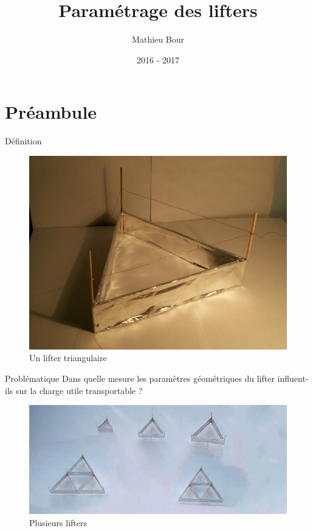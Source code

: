 \documentclass{beamer}
\title{Paramétrage des lifters}
\author{Mathieu Bour}
\date{2016 - 2017}
\begin{document}
	\begin{frame}
		\titlepage
	\end{frame}

	\section{Préambule}
		\begin{frame}{Définition}
			\begin{figure}
				\center
				\includegraphics[scale=0.3]{img/photo1.jpg}
				\caption{Un lifter triangulaire}
			\end{figure}
		\end{frame}
	
		\begin{frame}{Problématique}
			Dans quelle mesure les paramètres géométriques du lifter influent-ils sur la charge utile transportable ?
			\begin{figure}
				\center
				\includegraphics[scale=0.3]{img/lifters_p.jpg}
				\caption{Plusieurs lifters}
			\end{figure}
		\end{frame}
\end{document}
